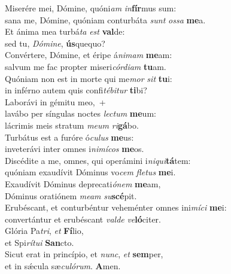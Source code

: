 \evenverse Miserére mei, Dómine, quóni\textit{am} \textit{in}\textbf{fír}mus sum:~\*\\
\evenverse sana me, Dómine, quóniam conturbáta \textit{sunt} \textit{os}\textit{sa} \textbf{me}a.\\
\oddverse Et ánima mea turbá\textit{ta} \textit{est} \textbf{val}de:~\*\\
\oddverse sed tu, \textit{Dó}\textit{mi}\textit{ne}, \textbf{ús}quequo?\\
\evenverse Convértere, Dómine, et éripe á\textit{ni}\textit{mam} \textbf{me}am:~\*\\
\evenverse salvum me fac propter miseri\textit{cór}\textit{di}\textit{am} \textbf{tu}am.\\
\oddverse Quóniam non est in morte qui me\textit{mor} \textit{sit} \textbf{tu}i:~\*\\
\oddverse in inférno autem quis confi\textit{té}\textit{bi}\textit{tur} \textbf{ti}bi?\\
\evenverse Laborávi in gémitu meo,~+\\
\evenverse  lavábo per síngulas noctes \textit{le}\textit{ctum} \textbf{me}um:~\*\\
\evenverse lácrimis meis stratum \textit{me}\textit{um} \textit{ri}\textbf{gá}bo.\\
\oddverse Turbátus est a furóre ó\textit{cu}\textit{lus} \textbf{me}us:~\*\\
\oddverse inveterávi inter omnes i\textit{ni}\textit{mí}\textit{cos} \textbf{me}os.\\
\evenverse Discédite a me, omnes, qui operámini i\textit{ni}\textit{qui}\textbf{tá}tem:~\*\\
\evenverse quóniam exaudívit Dóminus vo\textit{cem} \textit{fle}\textit{tus} \textbf{me}i.\\
\oddverse Exaudívit Dóminus deprecati\textit{ó}\textit{nem} \textbf{me}am,~\*\\
\oddverse Dóminus oratiónem \textit{me}\textit{am} \textit{su}\textbf{scé}pit.\\
\evenverse Erubéscant, et conturbéntur veheménter omnes ini\textit{mí}\textit{ci} \textbf{me}i:~\*\\
\evenverse convertántur et erubéscant \textit{val}\textit{de} \textit{ve}\textbf{ló}citer.\\
\oddverse Glória Pa\textit{tri}, \textit{et} \textbf{Fí}lio,~\*\\
\oddverse et Spi\textit{rí}\textit{tu}\textit{i} \textbf{San}cto.\\
\evenverse Sicut erat in princípio, et \textit{nunc}, \textit{et} \textbf{sem}per,~\*\\
\evenverse et in sǽcula sæ\textit{cu}\textit{ló}\textit{rum}. \textbf{A}men.\\
